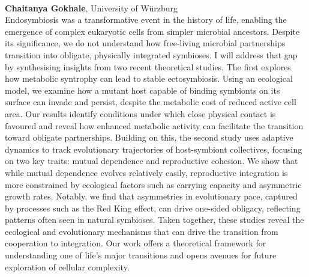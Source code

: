 \documentclass[12pt,a4paper]{article}
\begin{document}
\\[1ex]{ \large \textbf{ Chaitanya Gokhale}}, University of Würzburg \\[2ex] Endosymbiosis was a transformative event in the history of life, enabling the emergence of complex eukaryotic cells from simpler microbial ancestors. Despite its significance, we do not understand how free-living microbial partnerships transition into obligate, physically integrated symbioses. I will address that gap by synthesising insights from two recent theoretical studies. The first explores how metabolic syntrophy can lead to stable ectosymbiosis. Using an ecological model, we examine how a mutant host capable of binding symbionts on its surface can invade and persist, despite the metabolic cost of reduced active cell area. Our results identify conditions under which close physical contact is favoured and reveal how enhanced metabolic activity can facilitate the transition toward obligate partnerships. Building on this, the second study uses adaptive dynamics to track evolutionary trajectories of host-symbiont collectives, focusing on two key traits: mutual dependence and reproductive cohesion. We show that while mutual dependence evolves relatively easily, reproductive integration is more constrained by ecological factors such as carrying capacity and asymmetric growth rates. Notably, we find that asymmetries in evolutionary pace, captured by processes such as the Red King effect, can drive one-sided obligacy, reflecting patterns often seen in natural symbioses. Taken together, these studies reveal the ecological and evolutionary mechanisms that can drive the transition from cooperation to integration. Our work offers a theoretical framework for understanding one of life’s major transitions and opens avenues for future exploration of cellular complexity. 

\bigskip\bigskip

\newpage
\end{document}
